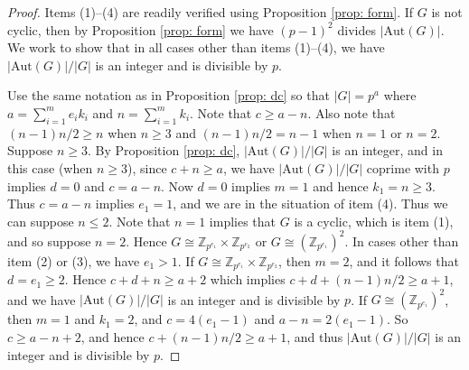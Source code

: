 \documentclass[10pt,a4paper]{amsart}
\begin{document}
\begin{proof}
Items (1)--(4) are readily verified using Proposition \ref{prop: form}.  If $G$ is not cyclic, then by Proposition \ref{prop: form} we have $(p-1)^2$ divides $|\mathrm{Aut}(G)|$.  We work to show that in all cases other than items (1)--(4), we have $|\mathrm{Aut}(G)|/|G|$ is an integer and is divisible by $p$.

Use the same notation as in Proposition \ref{prop: dc} so that $|G| = p^a$ where $a = {\sum_{i=1}^m e_i k_i}$ and $n = {\sum_{i=1}^m k_i}$.  Note that $c \geq a-n$.  Also note that $(n-1)n/2 \geq n$ when $n \geq 3$ and $(n-1)n/2 = n-1$ when $n=1$ or $n=2$.  Suppose $n \geq 3$.  By Proposition \ref{prop: dc}, $|\mathrm{Aut}(G)|/|G|$ is an integer, and in this case (when $n \geq 3$), since $c + n \geq a$, we have $|\mathrm{Aut}(G)|/|G|$ coprime with $p$ implies $d=0$ and $c = a - n$.  Now $d=0$ implies $m=1$ and hence $k_1 = n \geq 3$.  Thus $c = a - n$ implies $e_1 = 1$, and we are in the situation of item (4).  Thus we can suppose $n \leq 2$.  Note that $n=1$ implies that $G$ is a cyclic, which is item (1), and so suppose $n=2$.  Hence $G \cong \mathbb{Z}_{p^{e_1}} \times \mathbb{Z}_{p^{e_2}}$ or $G \cong (\mathbb{Z}_{p^{e_1}})^2$.  In cases other than item (2) or (3), we have $e_1 > 1$.  If $G \cong \mathbb{Z}_{p^{e_1}} \times \mathbb{Z}_{p^{e_2}}$, then $m = 2$, and it follows that $d = e_1 \geq 2$.  Hence $c + d + n \geq a+2$ which implies $c + d + (n-1)n/2 \geq a+1$, and we have $|\mathrm{Aut}(G)|/|G|$ is an integer and is divisible by $p$.  If $G \cong (\mathbb{Z}_{p^{e_1}})^2$, then $m=1$ and $k_1=2$, and $c = 4(e_1-1)$ and $a-n = 2(e_1-1)$.  So $c \geq a-n + 2$, and hence $c + (n-1)n/2 \geq a+1$, and thus $|\mathrm{Aut}(G)|/|G|$ is an integer and is divisible by $p$. 
\end{proof}
\end{document}
